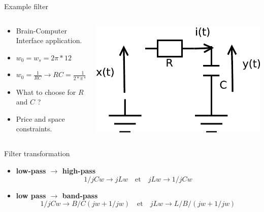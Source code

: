 \begin{block}{Example filter}
  \begin{columns}
\begin{column}{7cm}
\begin{itemize}
\item Brain-Computer Interface application.
\item $w_0=w_s=2\pi*12$
\item $w_0=\frac{1}{RC}\rightarrow RC={\frac{1}{2*\pi*12}\approx 0.01326}$
\item What to choose for $R$ and $C$ ?
\item Price and space constraints.
\end{itemize}     
\end{column}
\begin{column}{5cm}
\begin{center}
\includegraphics[width=.5\columnwidth]{imgs/fourier/RC2}
\end{center}
\end{column}
\end{columns}
\end{block}
\begin{block}{Filter transformation}
\begin{itemize}
\item \textbf{low-pass $\rightarrow$ high-pass}
$$ 1/jCw\rightarrow jLw \quad  \text{et} \quad jLw \rightarrow 1/jCw$$
\item \textbf{low pass $\rightarrow$ band-pass}
$$ 1/jCw\rightarrow B/C(jw+1/jw) \quad  \text{et} \quad jLw \rightarrow L/B/(jw+1/jw)$$
\end{itemize}
\end{block}

